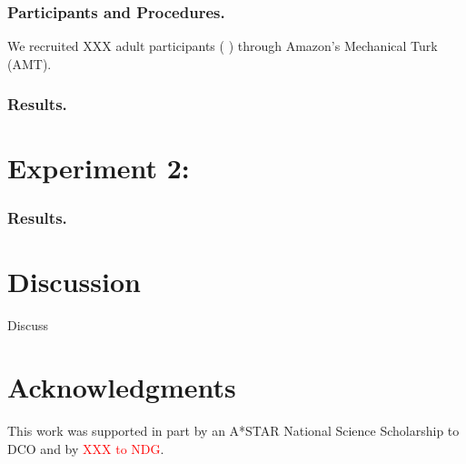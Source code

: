 \documentclass[10pt,letterpaper]{article}
\newcommand{\red}[1]{\textcolor{Red}{#1}}
\begin{document}

\subsubsection{Participants and Procedures.} 
We recruited XXX adult participants ( ) through Amazon's Mechanical Turk (AMT).





\subsubsection{Results.} 

\section{Experiment 2: }



\subsubsection{Results.} 





\section{Discussion}

Discuss

\section{Acknowledgments}

This work was supported in part by an A*STAR National Science Scholarship to DCO and by \red{XXX to NDG}.




\setlength{\bibleftmargin}{.125in}
\setlength{\bibindent}{-\bibleftmargin}


\end{document}
